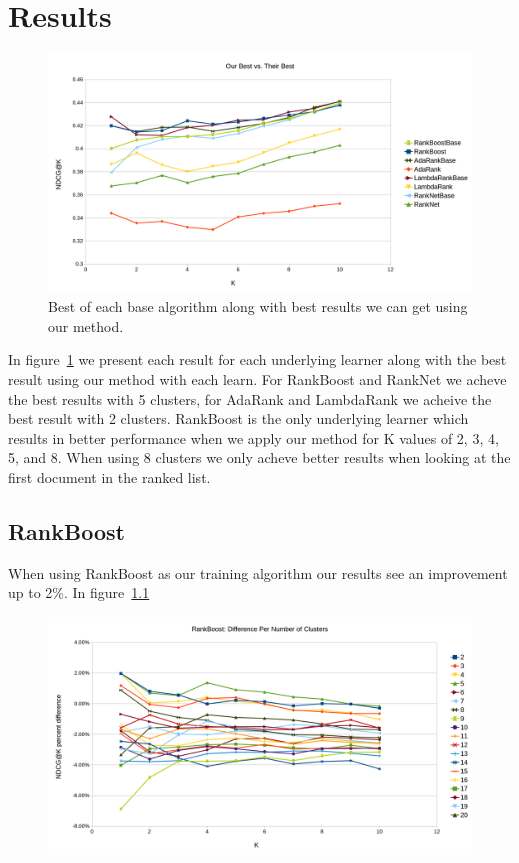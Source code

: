 \documentclass{article}
\begin{document}
    \section{Results}

    \begin{figure}[th!]
        \includegraphics[keepaspectratio=true,scale=0.35]{images/best_of_each.png}
        \caption{Best of each base algorithm along with best results we can get using our method.}
        \label{fig:best_of_all}
    \end{figure}

    In figure~\ref{fig:best_of_all} we present each result for each underlying learner along with the best result using our method with each learn.
    For RankBoost and RankNet we acheve the best results with 5 clusters, for AdaRank and LambdaRank we acheive the best result with 2 clusters.
    RankBoost is the only underlying learner which results in better performance when we apply our method for K values of 2, 3, 4, 5, and 8.
    When using 8 clusters we only acheve better results when looking at the first document in the ranked list.     

    \subsection{RankBoost}
    
    When using RankBoost as our training algorithm our results see an improvement up to 2\%.  In figure~\ref{}  

    \begin{figure}[th!]
        \includegraphics[keepaspectratio=true,scale=0.35]{images/rankboost_results.png}
    \end{figure}
\end{document}
